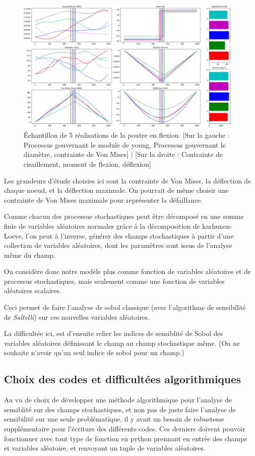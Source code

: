 \documentclass[a4paper,10pt]{article}
\begin{document}
\begin{figure}[H]
   \centering   
   \includegraphics[scale=0.33]{beam_experience.png}
      \caption{Échantillon de 5 réalisations de la poutre en flexion. [Sur la gauche : Processus gouvernant le module de young, Processus gouvernant le diamètre, contrainte de Von Mises] | [Sur la droite : Contrainte de cisaillement, moment de flexion, déflexion] }
         \label{beamExperience}
\end{figure}

Les grandeurs d'étude choisies ici sont la contrainte de Von Mises, la déflection de chaque noeud, et la déflection maximale. On pourrait de même choisir une contrainte de Von Mises maximale pour représenter la défaillance. 

Comme chacun des processus stochastiques peut être décomposé en une somme finie de variables aléatoires normales grâce à la décomposition de karhunen-Loeve, l'on peut à l'inverse, générer des champs stochastiques à partir d'une collection de variables aléatoires, dont les paramètres sont issus de l'analyse même du champ.

On considère donc notre modèle plus comme fonction de variables aléatoires et de processus stochastiques, mais seulement comme une fonction de variables aléatoires scalaires.

Ceci permet de faire l'analyse de sobol classique (avec l'algorithme de sensibilité de \textit{Saltelli}) sur ces nouvelles variables aléatoires.

La difficultée ici, est d'ensuite relier les indices de sensiblité de Sobol des variables aléatoires définissant le champ au champ stochastique même. (On ne souhaite n'avoir qu'un seul indice de sobol pour un champ.) 

\subsection{Choix des codes et difficultées algorithmiques}
Au vu de choix de développer une méthode algorithmique pour l'analyse de sensiblité sur des champs stochastiques, et non pas de juste faire l'analyse de sensibilité sur une seule problématique, il y avait un besoin de robustesse supplémentaire pour l'écriture des différents codes. Ces derniers doivent pouvoir fonctionner avec tout type de fonction en python prennant en entrée des champs et variables aléatoire, et renvoyant un tuple de variables aléatoires. 
\end{document}
